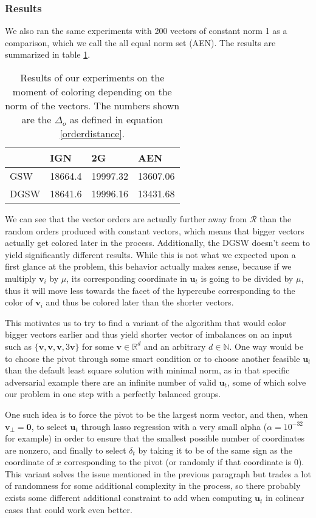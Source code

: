 \documentclass[12pt]{article}
\begin{document}
\subsubsection{Results}\label{results_norm_affect_when}
We also ran the same experiments with 200 vectors of constant norm 1 as a comparison, which we call the all equal norm set (AEN). The results are summarized in table \ref{norm_when_colored}.
\begin{table}[h!]
\centering
\caption{Results of our experiments on the moment of coloring depending on the norm of the vectors. The numbers shown are the $\Delta_o$ as defined in equation \ref{orderdistance}.}
\begin{tabular}{l|lll}
& IGN & 2G & AEN  \\
\hline
GSW & 18664.4 & 19997.32 & 13607.06 \\
DGSW & 18641.6 & 19996.16 & 13431.68
\end{tabular}
\label{norm_when_colored}
\end{table}

We can see that the vector orders are actually further away from $\mathcal{R}$ than the random orders produced with constant vectors, which means that bigger vectors actually get colored later in the process. Additionally, the DGSW doesn't seem to yield significantly different results. While this is not what we expected upon a first glance at the problem, this behavior actually makes sense, because if we multiply $\textbf{v}_i$ by $\mu%
$, its corresponding coordinate in $\textbf{u}_t$ is going to be divided by $\mu$, thus it will move less towards the facet of the hypercube corresponding to the color of $\textbf{v}_i$ and thus be colored later than the shorter vectors.

This motivates us to try to find a variant of the algorithm that would color bigger vectors earlier and thus yield shorter vector of imbalances on an input such as $\{\textbf{v},\textbf{v},\textbf{v},3\textbf{v}\}$ for some $\textbf{v}\in\mathbb{R}^d$ and an arbitrary $d\in\mathbb{N}$. One way would be to choose the pivot through some smart condition or to choose another feasible $\textbf{u}_t$ than the default least square solution with minimal norm, as in that specific adversarial example there are an infinite number of valid $\textbf{u}_t$, some of which solve our problem in one step with a perfectly balanced groups.

One such idea is to force the pivot to be the largest norm vector, and then, when $\textbf{v}_\perp=\textbf{0}$, to select $\textbf{u}_t$ through lasso regression with a very small alpha ($\alpha=10^{-32}$ for example) in order to ensure that the smallest possible number of coordinates are nonzero, and finally to select $\delta_t$ by taking it to be of the same sign as the coordinate of $x$ corresponding to the pivot (or randomly if that coordinate is 0). This variant solves the issue mentioned in the previous paragraph but trades a lot of randomness for some additional complexity in the process, so there probably exists some different additional constraint to add when computing $\textbf{u}_t$ in colinear cases that could work even better.
\end{document}
